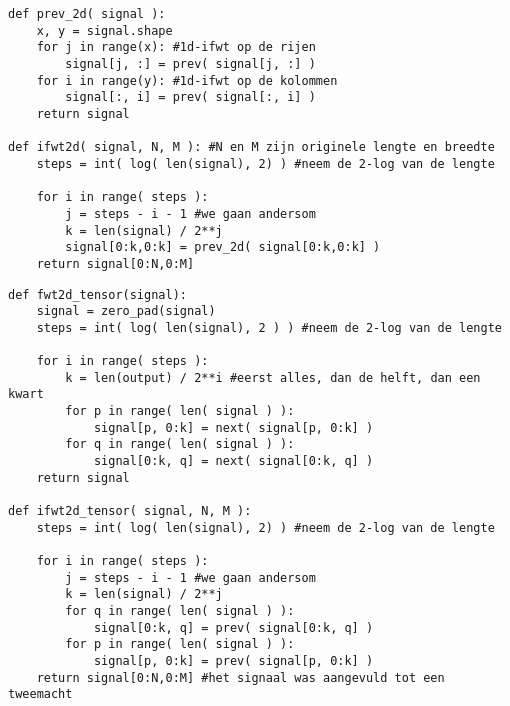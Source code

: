 \begin{lstlisting}[label=ifwt2d,float=h!,caption=De inverse Mallatdecompositie in 2 dimensies]	
def prev_2d( signal ):
	x, y = signal.shape
	for j in range(x): #1d-ifwt op de rijen
		signal[j, :] = prev( signal[j, :] )
	for i in range(y): #1d-ifwt op de kolommen
		signal[:, i] = prev( signal[:, i] )
	return signal

def ifwt2d( signal, N, M ): #N en M zijn originele lengte en breedte
	steps = int( log( len(signal), 2) ) #neem de 2-log van de lengte
	
	for i in range( steps ):
		j = steps - i - 1 #we gaan andersom
		k = len(signal) / 2**j
		signal[0:k,0:k] = prev_2d( signal[0:k,0:k] )
	return signal[0:N,0:M]
\end{lstlisting}

\begin{lstlisting}[label=tensorimpl,float=h!,caption=De 2D FWT in het Tensorgeval]
def fwt2d_tensor(signal):
	signal = zero_pad(signal)
	steps = int( log( len(signal), 2 ) ) #neem de 2-log van de lengte
	
	for i in range( steps ):
		k = len(output) / 2**i #eerst alles, dan de helft, dan een kwart
		for p in range( len( signal ) ):
			signal[p, 0:k] = next( signal[p, 0:k] )
		for q in range( len( signal ) ):
			signal[0:k, q] = next( signal[0:k, q] )
	return signal

def ifwt2d_tensor( signal, N, M ):
	steps = int( log( len(signal), 2) ) #neem de 2-log van de lengte
	
	for i in range( steps ):
		j = steps - i - 1 #we gaan andersom
		k = len(signal) / 2**j
		for q in range( len( signal ) ):
			signal[0:k, q] = prev( signal[0:k, q] )
		for p in range( len( signal ) ):
			signal[p, 0:k] = prev( signal[p, 0:k] )
	return signal[0:N,0:M] #het signaal was aangevuld tot een tweemacht
\end{lstlisting}

